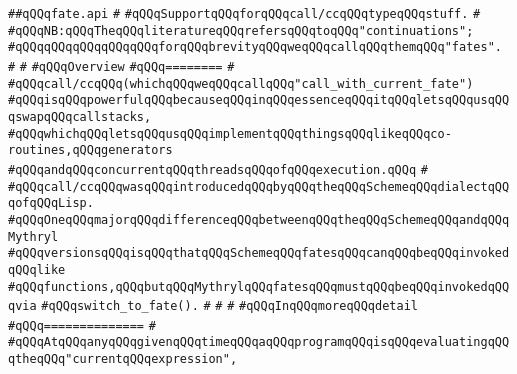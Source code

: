 \label{src/lib/std/src/nj/fate.api}
\verb|##qQQqfate.api|\newline
\verb|#|\newline
\verb|#qQQqSupportqQQqforqQQqcall/ccqQQqtypeqQQqstuff.|\newline
\verb|#|\newline
\verb|#qQQqNB:qQQqTheqQQqliteratureqQQqrefersqQQqtoqQQq"continuations";|\newline
\verb|#qQQqqQQqqQQqqQQqqQQqforqQQqbrevityqQQqweqQQqcallqQQqthemqQQq"fates".|\newline
\verb|#|\newline
\verb|#|\newline
\verb|#qQQqOverview|\newline
\verb|#qQQq========|\newline
\verb|#|\newline
\verb|#qQQqcall/ccqQQq(whichqQQqweqQQqcallqQQq"call_with_current_fate")|\newline
\verb|#qQQqisqQQqpowerfulqQQqbecauseqQQqinqQQqessenceqQQqitqQQqletsqQQqusqQQqswapqQQqcallstacks,|\newline
\verb|#qQQqwhichqQQqletsqQQqusqQQqimplementqQQqthingsqQQqlikeqQQqco-routines,qQQqgenerators|\newline
\verb|#qQQqandqQQqconcurrentqQQqthreadsqQQqofqQQqexecution.qQQq|\newline
\verb|#|\newline
\verb|#qQQqcall/ccqQQqwasqQQqintroducedqQQqbyqQQqtheqQQqSchemeqQQqdialectqQQqofqQQqLisp.|\newline
\verb|#qQQqOneqQQqmajorqQQqdifferenceqQQqbetweenqQQqtheqQQqSchemeqQQqandqQQqMythryl|\newline
\verb|#qQQqversionsqQQqisqQQqthatqQQqSchemeqQQqfatesqQQqcanqQQqbeqQQqinvokedqQQqlike|\newline
\verb|#qQQqfunctions,qQQqbutqQQqMythrylqQQqfatesqQQqmustqQQqbeqQQqinvokedqQQqvia|\newline
\verb|#qQQqswitch_to_fate().|\newline
\verb|#|\newline
\verb|#|\newline
\verb|#|\newline
\verb|#qQQqInqQQqmoreqQQqdetail|\newline
\verb|#qQQq==============|\newline
\verb|#|\newline
\verb|#qQQqAtqQQqanyqQQqgivenqQQqtimeqQQqaqQQqprogramqQQqisqQQqevaluatingqQQqtheqQQq"currentqQQqexpression",|\newline
